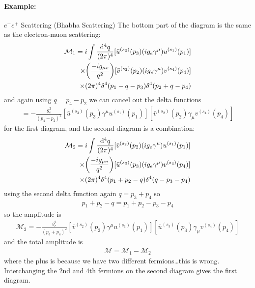 \documentclass[../main.tex]{subfiles}
\begin{document}
\paragraph*{Example:} $e^- e^+$ Scattering (Bhabha Scattering)
The bottom part of the diagram is the same as the electron-muon scattering:
\begin{align*}
    \mathcal{M}_1 = i \int \frac{\dd[4]{q}}{(2\pi)^4} [\bar u^{(s_3)}(p_3) (ig_e \gamma^\mu) u^{(s_1)}(p_1)] \\
    \times \qt(\frac{-i g_{\mu v}}{q^2}) [\bar v^{(s_2)}(p_2) (ig_e \gamma^\mu) v^{(s_4)}(p_4)] \\
    \times (2\pi)^4 \delta^4(p_1 - q - p_3) \delta^4(p_2 + q - p_4)
\end{align*}
and again using $q = p_4 - p_2$ we can cancel out the delta functions
\begin{align*}
    = -\frac{g_e^2}{(p_4 - p_2)^2} [\bar u^{(s_3)}(p_3) \gamma^\mu u^{(s_1)}(p_1)]
    [\bar v^{(s_2)}(p_2) \gamma_\mu v^{(s_4)}(p_4)]
\end{align*}
for the first diagram, and the second diagram is a combination:
\begin{align*}
    \mathcal{M}_2 = i \int \frac{\dd[4]{q}}{(2\pi)^4} [\bar v^{(s_2)}(p_2) (ig_e \gamma^\mu) u^{(s_1)}(p_1)] \\
    \times \qt(\frac{-i g_{\mu v}}{q^2}) [\bar u^{(s_3)}(p_3) (ig_e \gamma^\mu) v^{(s_4)}(p_4)] \\
    \times (2\pi)^4 \delta^4(p_1 + p_2 - q) \delta^4(q - p_3 - p_4)
\end{align*} 
using the second delta function again $q = p_3 + p_4$ so
\begin{align*}
    p_1 + p_2 - q = p_1 + p_2 - p_3 - p_4
\end{align*}
so the amplitude is
\begin{align*}
    \mathcal{M}_2 = -\frac{g_e^2}{(p_3 + p_4)^2} [\bar v^{(s_2)}(p_2) \gamma^\mu u^{(s_1)}(p_1)]
    [\bar u^{(s_3)}(p_3) \gamma_\mu v^{(s_4)}(p_4)]
\end{align*}
and the total amplitude is
\begin{align*}
    \mathcal{M} = \mathcal{M}_1 - \mathcal{M}_2
\end{align*}
where the plus is because we have two different fermions\dots this is wrong. Interchanging the
2nd and 4th fermions on the second diagram gives the first diagram. 
\end{document}
